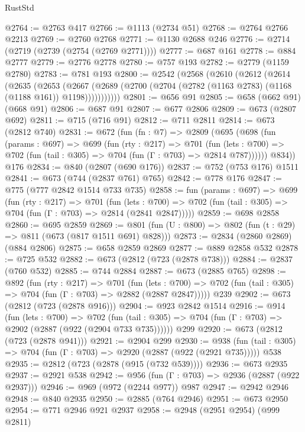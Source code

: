 \begin{lexlean}{RustStd}
\begin{coremodule}
{\begin{coremodule}
{{{{{{{{{{@2764 := @2763 @417
@2766 := @1113 (@2734 @51)
@2768 := @2764 @2766 @2213
@2769 := @2760 @2768
@2771 := @1130 @2688 @246
@2776 := @2714 (@2719 (@2739 (@2754 (@2769 @2771))))
@2777 := @687 @161
@2778 := @884 @2777
@2779 := @2776 @2778
@2780 := @757 @193
@2782 := @2779 (@1159 @2780)
@2783 := @781 @193
@2800 := @2542
    (@2568
      (@2610
        (@2612
          (@2614
            (@2635
              (@2653
                (@2667
                  (@2689 (@2700 (@2704 (@2782 (@1163 @2783) (@1168 (@1188 @161)) @1198)))))))))))
@2801 := @656 @91
@2805 := @658 (@662 @91) (@668 @91)
@2806 := @687 @91
@2807 := @677 @2806
@2809 := @673 (@2807 @692)
@2811 := @715 (@716 @91)
@2812 := @711 @2811
@2814 := @673 (@2812 @740)
@2831 := @672
    (fun (fn : @7) =>
    @2809
      (@695
        (@698
          (fun (params : @697) =>
          @699
            (fun (rty : @217) =>
            @701
              (fun (lets : @700) =>
              @702 (fun (tail : @305) => @704 (fun (Γ : @703) => @2814 @787))))))
        @834))
    @176
@2834 := @840 (@2807 (@690 @176))
@2837 := @752 (@753 @176) @1511
@2841 := @673 (@744 (@2837 @761) @765)
@2842 := @778 @176
@2847 := @775 (@777 @2842 @1514 @733 @735)
@2858 := fun (params : @697) =>
  @699
    (fun (rty : @217) =>
    @701
      (fun (lets : @700) =>
      @702 (fun (tail : @305) => @704 (fun (Γ : @703) => @2814 (@2841 @2847)))))
@2859 := @698 @2858
@2860 := @695 @2859
@2869 := @801 (fun (U : @800) => @802 (fun (t : @29) => @811 (@673 (@817 @1511 @691) @828)))
@2873 := @2834 (@2860 @2869) (@884 @2806)
@2875 := @658 @2859 @2869
@2877 := @889 @2858 @532
@2878 := @725 @532
@2882 := @673 (@2812 (@723 (@2878 @738)))
@2884 := @2837 (@760 @532)
@2885 := @744 @2884
@2887 := @673 (@2885 @765)
@2898 := @892
    (fun (rty : @217) =>
    @701
      (fun (lets : @700) =>
      @702 (fun (tail : @305) => @704 (fun (Γ : @703) => @2882 (@2887 @2847)))))
    @239
@2902 := @673 (@2812 (@723 (@2878 @916)))
@2904 := @923 @2842 @1514
@2916 := @914
    (fun (lets : @700) =>
    @702 (fun (tail : @305) => @704 (fun (Γ : @703) => @2902 (@2887 (@922 (@2904 @733 @735))))))
    @299
@2920 := @673 (@2812 (@723 (@2878 @941)))
@2921 := @2904 @299
@2930 := @938 (fun (tail : @305) => @704 (fun (Γ : @703) => @2920 (@2887 (@922 (@2921 @735))))) @538
@2935 := @2812 (@723 (@2878 (@915 (@732 @539))))
@2936 := @673 @2935
@2937 := @2921 @538
@2942 := @956 (fun (Γ : @703) => @2936 (@2887 (@922 @2937)))
@2946 := @969 (@972 (@2244 @977)) @987
@2947 := @2942 @2946
@2948 := @840 @2935
@2950 := @2885 (@764 @2946)
@2951 := @673 @2950
@2954 := @771 @2946 @921 @2937
@2958 := @2948 (@2951 @2954) (@999 @2811)
}}}}}}}}}}
\end{coremodule}}
\end{coremodule}
\end{lexlean}
